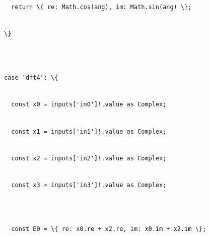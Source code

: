 \documentclass[
]{article}
\newcommand{\passthrough}[1]{#1}
\begin{document}
\passthrough{\lstinline!  !}\passthrough{\lstinline!return!}\passthrough{\lstinline! !}\passthrough{\lstinline!\{!}\passthrough{\lstinline! !}\passthrough{\lstinline!re:!}\passthrough{\lstinline! !}\passthrough{\lstinline!Math.cos!}\passthrough{\lstinline!(ang),!}\passthrough{\lstinline! !}\passthrough{\lstinline!im:!}\passthrough{\lstinline! !}\passthrough{\lstinline!Math.sin!}\passthrough{\lstinline!(ang)!}\passthrough{\lstinline! !}\passthrough{\lstinline!\};!}\strut \\
\passthrough{\lstinline!\}!}\strut \\
\strut \\
\passthrough{\lstinline!case!}\passthrough{\lstinline! !}\passthrough{\lstinline!'dft4':!}\passthrough{\lstinline! !}\passthrough{\lstinline!\{!}\strut \\
\passthrough{\lstinline!  !}\passthrough{\lstinline!const!}\passthrough{\lstinline! !}\passthrough{\lstinline!x0!}\passthrough{\lstinline! !}\passthrough{\lstinline!=!}\passthrough{\lstinline! !}\passthrough{\lstinline"inputs['in0']!.value"}\passthrough{\lstinline! !}\passthrough{\lstinline!as!}\passthrough{\lstinline! !}\passthrough{\lstinline!Complex;!}\strut \\
\passthrough{\lstinline!  !}\passthrough{\lstinline!const!}\passthrough{\lstinline! !}\passthrough{\lstinline!x1!}\passthrough{\lstinline! !}\passthrough{\lstinline!=!}\passthrough{\lstinline! !}\passthrough{\lstinline"inputs['in1']!.value"}\passthrough{\lstinline! !}\passthrough{\lstinline!as!}\passthrough{\lstinline! !}\passthrough{\lstinline!Complex;!}\strut \\
\passthrough{\lstinline!  !}\passthrough{\lstinline!const!}\passthrough{\lstinline! !}\passthrough{\lstinline!x2!}\passthrough{\lstinline! !}\passthrough{\lstinline!=!}\passthrough{\lstinline! !}\passthrough{\lstinline"inputs['in2']!.value"}\passthrough{\lstinline! !}\passthrough{\lstinline!as!}\passthrough{\lstinline! !}\passthrough{\lstinline!Complex;!}\strut \\
\passthrough{\lstinline!  !}\passthrough{\lstinline!const!}\passthrough{\lstinline! !}\passthrough{\lstinline!x3!}\passthrough{\lstinline! !}\passthrough{\lstinline!=!}\passthrough{\lstinline! !}\passthrough{\lstinline"inputs['in3']!.value"}\passthrough{\lstinline! !}\passthrough{\lstinline!as!}\passthrough{\lstinline! !}\passthrough{\lstinline!Complex;!}\strut \\
\strut \\
\passthrough{\lstinline!  !}\passthrough{\lstinline!const!}\passthrough{\lstinline! !}\passthrough{\lstinline!E0!}\passthrough{\lstinline! !}\passthrough{\lstinline!=!}\passthrough{\lstinline! !}\passthrough{\lstinline!\{!}\passthrough{\lstinline! !}\passthrough{\lstinline!re:!}\passthrough{\lstinline! !}\passthrough{\lstinline!x0.re!}\passthrough{\lstinline! !}\passthrough{\lstinline!+!}\passthrough{\lstinline! !}\passthrough{\lstinline!x2.re,!}\passthrough{\lstinline! !}\passthrough{\lstinline!im:!}\passthrough{\lstinline! !}\passthrough{\lstinline!x0.im!}\passthrough{\lstinline! !}\passthrough{\lstinline!+!}\passthrough{\lstinline! !}\passthrough{\lstinline!x2.im!}\passthrough{\lstinline! !}\passthrough{\lstinline!\};!}\strut \\
\end{document}
